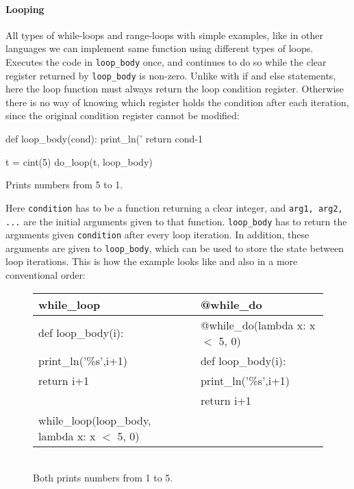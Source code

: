 \paragraph{Looping}
All types of while-loops and range-loops with simple examples, like in other languages we can implement same function using different types of loops.
Executes the code in \verb|loop_body| once, and continues to do so while the clear register returned by \verb|loop_body| is non-zero. Unlike with if and else statements, here the loop function must always return the loop condition register. Otherwise there is no way of knowing which register holds the condition after each iteration, since the original condition register cannot be modified: 
\begin{mylisting}
def loop_body(cond):
    print_ln('%
    return cond-1

t = cint(5)
do_loop(t, loop_body)
\end{mylisting}
\begin{footnotesize}
Prints numbers from 5 to 1.
\end{footnotesize}

Here \verb+condition+ has to be a function returning a clear integer, and \verb+arg1, arg2, ...+ are the initial arguments given to that
function. \verb+loop_body+ has to return the arguments given \verb+condition+ after every loop iteration. In addition, these arguments are given to \verb+loop_body+, which can be used to store the state between loop iterations. This is how the example looks like and also in a more conventional order:

\begin{figure}[h!]
\centering
\begin{tabular}{|l|l|} \hline
\textbf{while_loop}                         & \textbf{@while_do}                \\ \hline
def loop_body(i):                           & @while_do(lambda x: x $<$ 5, 0)  \\
\hspace{5 mm}print_ln('\%s',i+1)            & def loop_body(i):                \\
\hspace{5 mm}return i+1                     & \hspace{5 mm}print_ln('\%s',i+1) \\
                                            & \hspace{5 mm}return i+1          \\
while_loop(loop_body, lambda x: x $<$ 5, 0) &                                  \\ \hline
\end{tabular}
\begin{footnotesize}
\\ Both prints numbers from 1 to 5.
\end{footnotesize}
\end{figure}

